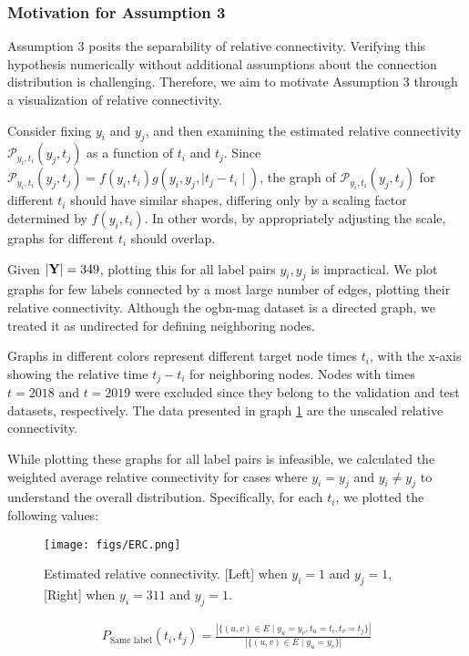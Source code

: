 \subsubsection{Motivation for Assumption 3}

Assumption 3 posits the separability of relative connectivity. Verifying this hypothesis numerically without additional assumptions about the connection distribution is challenging. Therefore, we aim to motivate Assumption 3 through a visualization of relative connectivity.

Consider fixing $ y_i $ and $ y_j $, and then examining the estimated relative connectivity $\mathcal{P}_{y_i, t_i} (y_j, t_j)$ as a function of $ t_i $ and $ t_j $. Since $\mathcal{P}_{y_i, t_i} (y_j, t_j) = f(y_i, t_i) g(y_i, y_j, \mid t_j - t_i \mid)$, the graph of $\mathcal{P}_{y_i, t_i} (y_j, t_j)$ for different $ t_i $ should have similar shapes, differing only by a scaling factor determined by $ f(y_i, t_i) $. In other words, by appropriately adjusting the scale, graphs for different $ t_i $ should overlap.

Given $ |\bold{Y}| = 349 $, plotting this for all label pairs $ y_i, y_j $ is impractical. We plot graphs for few labels connected by a most large number of edges, plotting their relative connectivity. Although the ogbn-mag dataset is a directed graph, we treated it as undirected for defining neighboring nodes.

Graphs in different colors represent different target node times $ t_i $, with the x-axis showing the relative time $ t_j - t_i $ for neighboring nodes. Nodes with times $ t = 2018 $ and $ t = 2019 $ were excluded since they belong to the validation and test datasets, respectively. The data presented in graph \ref{fig:ERC} are the unscaled relative connectivity.

While plotting these graphs for all label pairs is infeasible, we calculated the weighted average relative connectivity for cases where $ y_i = y_j $ and $ y_i \neq y_j $ to understand the overall distribution. Specifically, for each $ t_i $, we plotted the following values:
\begin{figure}[hbt!]
	\centering
	\texttt{[image: figs/ERC.png]}
	\vspace{-0.1in}
	\caption{Estimated relative connectivity. [Left] when $y_i=1$ and $y_j=1$, [Right] when $y_i=311$ and $y_j=1$.}
	 \label{fig:ERC}
\end{figure}

\begin{align}
P_{\text{Same label}}(t_i, t_j) = \frac{|\{(u, v) \in E \mid y_u = y_v, t_u = t_i, t_v = t_j\}|}{|\{(u, v) \in E \mid y_u = y_v\}|}
\end{align}


